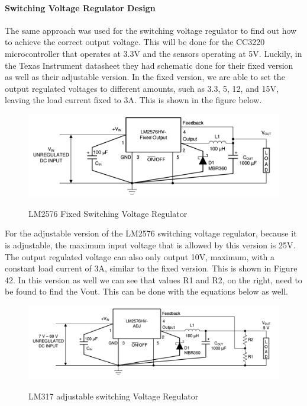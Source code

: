 \paragraph{Switching Voltage Regulator Design}
The same approach was used for the switching voltage regulator to find out how to achieve the correct output voltage. This will be done for the CC3220 microcontroller that operates at 3.3V and the sensors operating at 5V. Luckily, in the Texas Instrument datasheet they had schematic done for their fixed version as well as their adjustable version. In the fixed version, we are able to set the output regulated voltages to different amounts, such as 3.3, 5, 12, and 15V, leaving the load current fixed to 3A. This is shown in the figure below.\par
\begin{figure}[H]
    \centering
    \caption{LM2576 Fixed Switching Voltage Regulator}
    \includegraphics[width=\textwidth]{images/LM2576_Fixed.png}
    \label{fig:fixed-switching-voltage-regulator}
\end{figure}
For the adjustable version of the LM2576 switching voltage regulator, because it is adjustable, the maximum input voltage that is allowed by this version is 25V. The output regulated voltage can also only output 10V, maximum, with a constant load current of 3A, similar to the fixed version. This is shown in Figure 42. In this version as well we can see that values R1 and R2, on the right, need to be found to find the Vout. This can be done with the equations below as well.\par
\begin{figure}[H]
    \centering
    \caption{LM317 adjustable switching Voltage Regulator}
    \includegraphics[width=\textwidth]{images/LM2576_Adjustable.png}
    \label{fig:5V-linear-voltage-regulator}
\end{figure}

